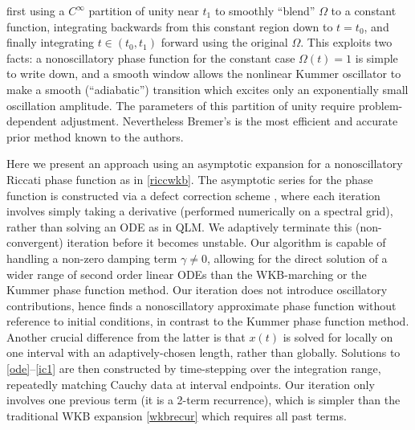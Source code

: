 \documentclass[10pt]{article}
\newcommand{\g}{\gamma}
\newcommand{\Fruzsi}[1]{{\color{blue}#1}}
\begin{document}
first using a $C^\infty$ partition of unity near $t_1$ to smoothly ``blend'' $\Omega$ to
a constant function, integrating backwards from this constant region
down to $t = t_0$, and finally integrating $t \in (t_0,t_1)$ forward using the original $\Omega$.
This exploits two facts: a nonoscillatory phase function for
the constant case $\Omega(t) = 1$ is simple to write down, and
a smooth window allows the nonlinear Kummer oscillator to make a smooth 
(``adiabatic'')
transition which excites only an exponentially small oscillation amplitude.
The parameters of this partition of unity require problem-dependent
adjustment.
Nevertheless Bremer's is the most efficient
and accurate prior method known to the authors.

Here we present an approach using an asymptotic expansion for a nonoscillatory Riccati phase function as in \cref{riccwkb}.
%
The asymptotic series for the phase function is constructed
via a defect
correction scheme \cite{bohmer1984},
where each iteration involves simply taking a derivative
(performed numerically on a spectral grid), rather than solving
an ODE as in QLM.
We adaptively terminate this (non-convergent) iteration before it becomes unstable.
%
Our algorithm is capable of handling a non-zero damping term $\g \neq 0$,
allowing for the direct solution of a wider range of second order linear ODEs
than the WKB-marching or the Kummer phase function method.
%
Our iteration does not introduce oscillatory contributions,
hence finds a nonoscillatory approximate phase function without
reference to initial conditions, in contrast to the
Kummer phase function method. 
%
Another crucial difference from the latter is that $x(t)$ is solved for
locally on one interval with an adaptively-chosen length, rather than globally.
Solutions to \eqref{ode}--\eqref{ic1} are then constructed by time-stepping over the
integration range, repeatedly matching Cauchy data at interval endpoints.
%
Our iteration only involves one previous term (it is a 2-term recurrence),
which is simpler than the traditional WKB expansion
\cref{wkbrecur} which requires all past terms.
%
%
\end{document}
